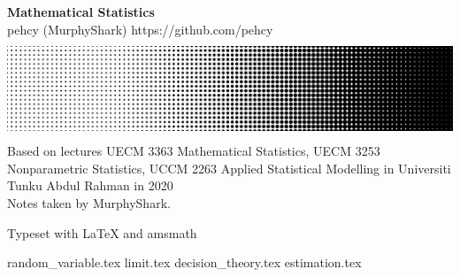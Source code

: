 \documentclass[11pt,twoside]{report}
\begin{document}
\begin{titlepage}
  \centering
  \vfill
  {\Large
      \textbf{Mathematical Statistics}\\
      \vskip2cm
      pehcy (MurphyShark) \quad \textsf{https://github.com/pehcy} \\
  }    
  \vfill
  \includegraphics[width=0.8\paperwidth, height=3cm]{./src/images/HalftoneGradient.png} %
  \vskip2cm
  {
    Based on lectures UECM 3363 Mathematical Statistics, UECM 3253 Nonparametric Statistics, UCCM 2263 Applied Statistical Modelling in Universiti Tunku Abdul Rahman in 2020\\
    Notes taken by MurphyShark.
  }
  \vfill
  \begin{flushleft}
    \footnotesize Typeset with \LaTeX \> and amsmath
  \end{flushleft}
\end{titlepage}
{random_variable.tex}
{limit.tex}
{decision_theory.tex}
{estimation.tex}
\end{document}
